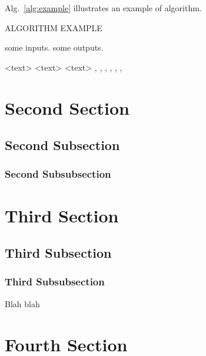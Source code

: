 \documentclass[11pt]{book}
\begin{document}
Alg.~\ref{alg:example} illustrates an example of algorithm.

\begin{algorithm}[ht]
\caption{ALGORITHM EXAMPLE}
\label{alg:example}
\begin{algorithmic}[1]
\REQUIRE some inputs.
\ENSURE some outputs.

\STATE <text>
   \ENDIF
   \ENDFOR
   \ENDFOR
   \ENDFOR
   \ENDWHILE
 \REPEAT {} 
 \LOOP {} \ENDLOOP
 \RETURN <text>
 \PRINT <text>
 \AND, \OR, \XOR, \NOT, \TO, \TRUE, \FALSE

\end{algorithmic}
\end{algorithm}

\section{Second Section}

\subsection{Second Subsection}

\subsubsection{Second Subsubsection}

\section{Third Section}

\subsection{Third Subsection}

\subsubsection{Third Subsubsection}

Blah blah

\section{Fourth Section}
\end{document}
